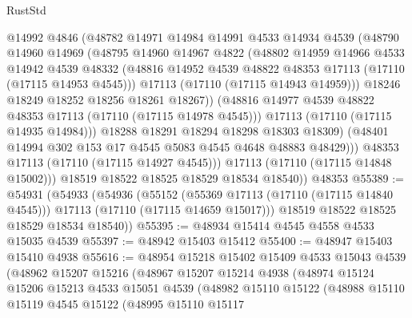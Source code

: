 \begin{lexlean}{RustStd}
\begin{coremodule}
                  @14992
                  @4846
                  (@48782
                    @14971
                    @14984
                    @14991
                    @4533
                    @14934
                    @4539
                    (@48790
                      @14960
                      @14969
                      (@48795
                        @14960
                        @14967
                        @4822
                        (@48802
                          @14959
                          @14966
                          @4533
                          @14942
                          @4539
                          @48332
                          (@48816 @14952 @4539 @48822 @48353 @17113 (@17110 (@17115 @14953 @4545)))
                          @17113
                          (@17110 (@17115 @14943 @14959)))
                        @18246
                        @18249
                        @18252
                        @18256
                        @18261
                        @18267))
                    (@48816 @14977 @4539 @48822 @48353 @17113 (@17110 (@17115 @14978 @4545)))
                    @17113
                    (@17110 (@17115 @14935 @14984)))
                  @18288
                  @18291
                  @18294
                  @18298
                  @18303
                  @18309)
                (@48401 @14994 @302 @153 @17 @4545 @5083 @4545 @4648 @48883 @48429)))
            @48353
            @17113
            (@17110 (@17115 @14927 @4545)))
          @17113
          (@17110 (@17115 @14848 @15002)))
        @18519
        @18522
        @18525
        @18529
        @18534
        @18540))
    @48353
@55389 := @54931
    (@54933
      (@54936
        (@55152
          (@55369 @17113 (@17110 (@17115 @14840 @4545)))
          @17113
          (@17110 (@17115 @14659 @15017)))
        @18519
        @18522
        @18525
        @18529
        @18534
        @18540))
@55395 := @48934 @15414 @4545 @4558 @4533 @15035 @4539
@55397 := @48942 @15403 @15412
@55400 := @48947 @15403 @15410 @4938
@55616 := @48954
    @15218
    @15402
    @15409
    @4533
    @15043
    @4539
    (@48962
      @15207
      @15216
      (@48967
        @15207
        @15214
        @4938
        (@48974
          @15124
          @15206
          @15213
          @4533
          @15051
          @4539
          (@48982
            @15110
            @15122
            (@48988
              @15110
              @15119
              @4545
              @15122
              (@48995
                @15110
                @15117

\end{coremodule}
\end{lexlean}
